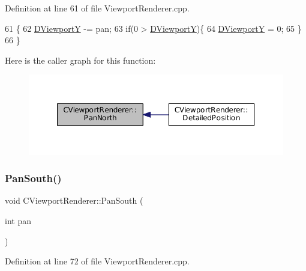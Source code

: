 Definition at line 61 of file Viewport\+Renderer.\+cpp.


\begin{DoxyCode}
61                                        \{
62     \hyperlink{classCViewportRenderer_ae13dd437a3da3d2bab16bc7ba61cb78f}{DViewportY} -= pan;
63     \textcolor{keywordflow}{if}(0 > \hyperlink{classCViewportRenderer_ae13dd437a3da3d2bab16bc7ba61cb78f}{DViewportY})\{
64         \hyperlink{classCViewportRenderer_ae13dd437a3da3d2bab16bc7ba61cb78f}{DViewportY} = 0;
65     \}
66 \}
\end{DoxyCode}
Here is the caller graph for this function\+:
\nopagebreak
\begin{figure}[H]
\begin{center}
\leavevmode
\includegraphics[width=350pt]{classCViewportRenderer_a3dae20056eb4f9fc1c7d8238737ab290_icgraph}
\end{center}
\end{figure}
\hypertarget{classCViewportRenderer_ad4aa68d96923dbea1bfd9ae3f23a3132}{}\label{classCViewportRenderer_ad4aa68d96923dbea1bfd9ae3f23a3132} 
\subsubsection{\texorpdfstring{Pan\+South()}{PanSouth()}}
{\footnotesize\ttfamily void C\+Viewport\+Renderer\+::\+Pan\+South (\begin{DoxyParamCaption}\item[{int}]{pan }\end{DoxyParamCaption})}



Definition at line 72 of file Viewport\+Renderer.\+cpp.


